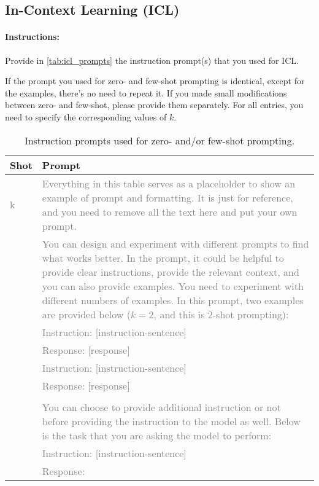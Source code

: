 \documentclass{article}
\begin{document}
\subsection{In-Context Learning (ICL)}\label{sec:llm:icl}

\paragraph{Instructions:} Provide in \autoref{tab:icl_prompts} the instruction prompt(s) that you used for ICL.

If the prompt you used for zero- and few-shot prompting is identical, except for the examples, there's no need to repeat it. 
If you made small modifications between zero- and few-shot, please provide them separately.
For all entries, you need to specify the corresponding values of $k$.




\begin{table}[h!]
\centering
\begin{tabular}{p{1cm}p{12cm}}
\toprule
\textbf{Shot} & \textbf{Prompt} \\
\midrule
    \textcolor{gray}{k} & \textcolor{gray}{Everything in this table serves as a placeholder to show an example of prompt and formatting. It is just for reference, and you need to remove all the text here and put your own prompt.} \\
    & \textcolor{gray}{You can design and experiment with different prompts to find what works better. In the prompt, it could be helpful to provide clear instructions, provide the relevant context, and you can also provide examples. You need to experiment with different numbers of examples. In this prompt, two examples are provided below ($k = 2$, and this is 2-shot prompting):} \\
    & \textcolor{gray}{Instruction: [instruction-sentence]} \\
    & \textcolor{gray}{Response: [response]} \\
    & \textcolor{gray}{Instruction: [instruction-sentence]} \\
    & \textcolor{gray}{Response: [response]} \\
    & \\
    & \textcolor{gray}{You can choose to provide additional instruction or not before providing the instruction to the model as well. Below is the task that you are asking the model to perform:} \\
    & \textcolor{gray}{Instruction: [instruction-sentence]} \\
    & \textcolor{gray}{Response: } \\
\bottomrule
\end{tabular}
\caption{Instruction prompts used for zero- and/or few-shot prompting.}
\label{tab:icl_prompts}
\end{table}
\end{document}
